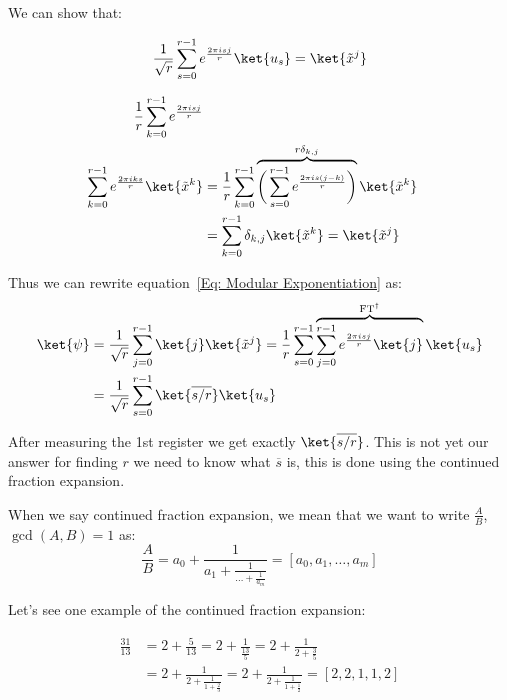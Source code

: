 We can show that:

\begin{equation*}
    \frac{1}{\sqrt{r}} \sum_{s=0}^{r-1}e^{\frac{2 \pi i s j }{r}} \ket{u_s} = \ket{\Tilde{x}^j}
\end{equation*}

\begin{equation*}
\begin{split}
    \frac{1}{r} \sum_{k=0}^{r-1} e^{\frac{2 \pi i s j }{r}} \\ \sum_{k=0}^{r-1} e^{\frac{2 \pi i k s}{r}} \ket{\Tilde{x}^k}  & = \frac{1}{r} \sum_{k=0}^{r-1} \overbrace{\bigg( \sum_{s=0}^{r-1} e^{\frac{2 \pi i s (j - k)}{r}} \bigg)}^{r \delta_{k,j}} \ket{\Tilde{x}^k}\\
    & = \sum_{k=0}^{r-1} \delta_{k,j} \ket{\Tilde{x}^k} = \ket{\Tilde{x}^j}
\end{split}
\end{equation*}

Thus we can rewrite equation~\ref{Eq: Modular Exponentiation} as:
\begin{equation*}
\begin{split}
    \ket{\psi} & = \frac{1}{\sqrt{r}} \sum_{j=0}^{r-1} \ket{j} \ket{\Tilde{x}^j} = \frac{1}{r} \sum_{s=0}^{r-1} \overbrace{\sum_{j=0}^{r-1} e^{\frac{2 \pi i s j}{r}} \ket{j}}^{\mathrm{FT}^\dagger} \ket{u_s} \\
    & = \frac{1}{\sqrt{r}} \sum_{s=0}^{r-1} \ket{\overline{s/r}} \ket{u_s}
\end{split}
\end{equation*}

After measuring the 1st register we get exactly $\ket{\overline{s/r}}$. This is not yet our answer for finding $r$ we need to know what $\overline{s}$ is, this is done using the continued fraction expansion.

When we say continued fraction expansion, we mean that we want to write $\frac{A}{B}$, $\gcd(A,B) = 1$ as:
\begin{equation}
    \label{Eq: Continued Fraction Expansion}
    \frac{A}{B} = a_0 + \frac{1}{a_1 + \frac{1}{\dots + \frac{1}{a_m}}} = [a_0, a_1, \dots, a_m]
\end{equation}

Let's see one example of the continued fraction expansion:

\begin{equation*}
\begin{split}
    \frac{31}{13} & = 2 + \frac{5}{13} = 2 + \frac{1}{\frac{13}{5}} = 2 + \frac{1}{2 + \frac{3}{5}} \\
    & = 2 + \frac{1}{2 + \frac{1}{1 + \frac{2}{3}}} = 2 + \frac{1}{2 + \frac{1}{1 + \frac{1}{2}}} = [2,2,1,1,2]
\end{split}
\end{equation*}

